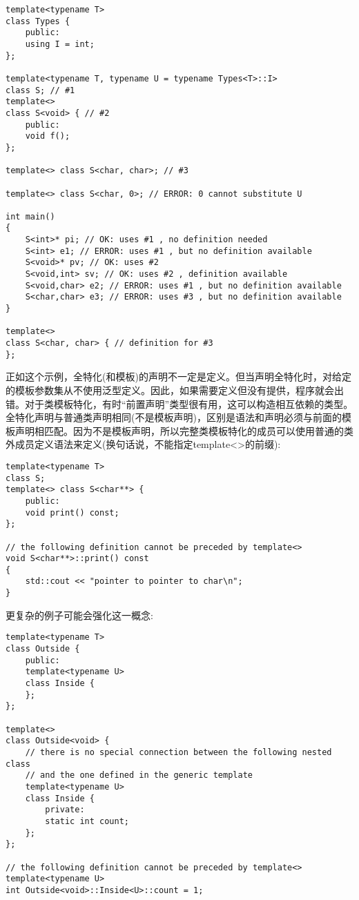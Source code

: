 \begin{lstlisting}[style=styleCXX]
template<typename T>
class Types {
	public:
	using I = int;
};

template<typename T, typename U = typename Types<T>::I>
class S; // #1
template<>
class S<void> { // #2
	public:
	void f();
};

template<> class S<char, char>; // #3

template<> class S<char, 0>; // ERROR: 0 cannot substitute U

int main()
{
	S<int>* pi; // OK: uses #1 , no definition needed
	S<int> e1; // ERROR: uses #1 , but no definition available
	S<void>* pv; // OK: uses #2
	S<void,int> sv; // OK: uses #2 , definition available
	S<void,char> e2; // ERROR: uses #1 , but no definition available
	S<char,char> e3; // ERROR: uses #3 , but no definition available
}

template<>
class S<char, char> { // definition for #3
};
\end{lstlisting}

正如这个示例，全特化(和模板)的声明不一定是定义。但当声明全特化时，对给定的模板参数集从不使用泛型定义。因此，如果需要定义但没有提供，程序就会出错。对于类模板特化，有时“前置声明”类型很有用，这可以构造相互依赖的类型。全特化声明与普通类声明相同(不是模板声明)，区别是语法和声明必须与前面的模板声明相匹配。因为不是模板声明，所以完整类模板特化的成员可以使用普通的类外成员定义语法来定义(换句话说，不能指定template<>的前缀):

\begin{lstlisting}[style=styleCXX]
template<typename T>
class S;
template<> class S<char**> {
	public:
	void print() const;
};

// the following definition cannot be preceded by template<>
void S<char**>::print() const
{
	std::cout << "pointer to pointer to char\n";
}
\end{lstlisting}

更复杂的例子可能会强化这一概念:

\begin{lstlisting}[style=styleCXX]
template<typename T>
class Outside {
	public:
	template<typename U>
	class Inside {
	};
};

template<>
class Outside<void> {
	// there is no special connection between the following nested class
	// and the one defined in the generic template
	template<typename U>
	class Inside {
		private:
		static int count;
	};
};

// the following definition cannot be preceded by template<>
template<typename U>
int Outside<void>::Inside<U>::count = 1;
\end{lstlisting}

